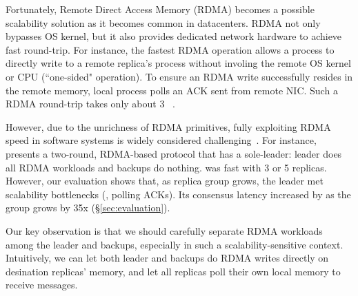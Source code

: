 Fortunately, Remote Direct Access Memory (RDMA) becomes a possible scalability 
solution as it becomes common in datacenters. RDMA not only bypasses OS 
kernel, but it also provides dedicated network hardware to achieve fast 
round-trip. For instance, the fastest RDMA operation allows a process to 
directly write to a remote replica's process without involing the remote OS 
kernel or CPU (``one-sided" operation). To ensure an RDMA write successfully 
resides in the remote memory, local process polls an ACK sent from remote NIC. 
Such a RDMA round-trip takes only about 3 \us~\cite{pilaf:usenix14}.


However, due to the unrichness of RDMA primitives, fully exploiting RDMA
speed in software systems is widely
considered challenging~\cite{pilaf:usenix14,herd:sigcomm14,
farm:sosp15,dare:hpdc15}. For instance, \dare~\cite{dare:hpdc15} presents a
two-round, RDMA-based \paxos protocol that has a sole-leader: leader does all 
RDMA workloads and backups do nothing. \dare was fast with 3 or 5 
replicas. However, our evaluation shows that, as replica group grows, the 
leader met scalability bottlenecks (\eg, polling ACKs). Its consensus 
latency increased by \darescalability as the group grows by 35x
(\S\ref{sec:evaluation}).



Our key observation is that we should carefully separate RDMA workloads among
the leader and backups, especially in such a scalability-sensitive 
context. Intuitively, we can let both leader and backups do RDMA writes 
directly on desination replicas' memory, and let all replicas poll their own 
local memory to receive messages.

